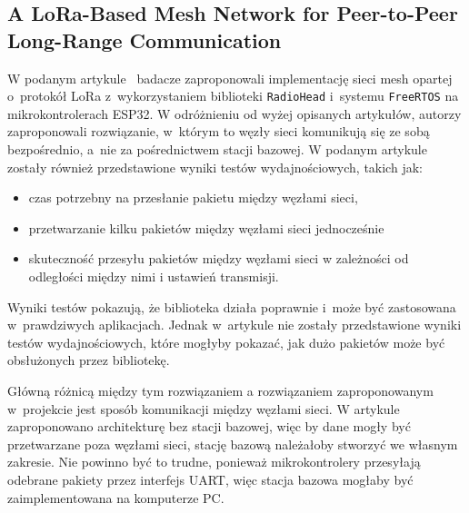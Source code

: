 \subsection{A LoRa-Based Mesh Network for Peer-to-Peer Long-Range Communication}
W podanym artykule~\cite{s21134314} badacze zaproponowali implementację sieci mesh opartej o~protokół LoRa z~wykorzystaniem biblioteki \texttt{RadioHead} i~systemu \texttt{FreeRTOS} na mikrokontrolerach ESP32.
W odróżnieniu od wyżej opisanych artykułów, autorzy zaproponowali rozwiązanie, w~którym to węzły sieci komunikują się ze sobą bezpośrednio, a~nie za pośrednictwem stacji bazowej.
W podanym artykule zostały również przedstawione wyniki testów wydajnościowych, takich jak:
\begin{itemize}
    \item czas potrzebny na przesłanie pakietu między węzłami sieci,
    \item przetwarzanie kilku pakietów między węzłami sieci jednocześnie
    \item skuteczność przesyłu pakietów między węzłami sieci w zależności od odległości między nimi i ustawień transmisji.
\end{itemize}

Wyniki testów pokazują, że biblioteka działa poprawnie i~może być zastosowana w~prawdziwych aplikacjach.
Jednak w~artykule nie zostały przedstawione wyniki testów wydajnościowych, które mogłyby pokazać, jak dużo pakietów może być obsłużonych przez bibliotekę.

Główną różnicą między tym rozwiązaniem a rozwiązaniem zaproponowanym w~projekcie jest sposób komunikacji między węzłami sieci.
W artykule zaproponowano architekturę bez stacji bazowej, więc by dane mogły być przetwarzane poza węzłami sieci, stację bazową należałoby stworzyć we własnym zakresie.
Nie powinno być to trudne, ponieważ mikrokontrolery przesyłają odebrane pakiety przez interfejs UART, więc stacja bazowa mogłaby być zaimplementowana na komputerze PC.
